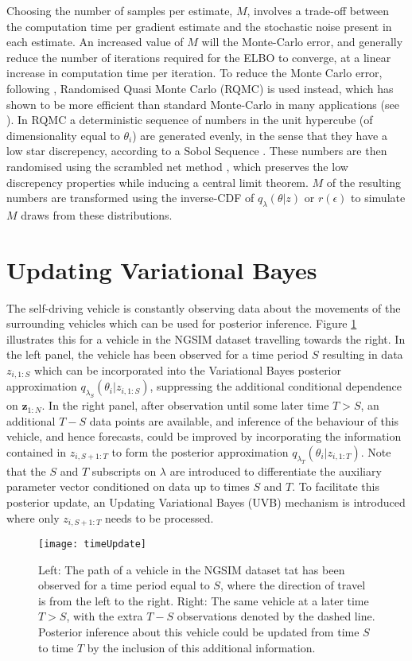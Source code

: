 \documentclass[12pt,a4paper]{article}\usepackage[]{graphicx}\usepackage[]{color}
\begin{document}
Choosing the number of samples per estimate, $M$, involves a trade-off between the computation time per gradient estimate and the stochastic noise present in each estimate. An increased value of $M$ will the Monte-Carlo error, and generally reduce the number of iterations required for the ELBO to converge, at a linear increase in computation time per iteration. To reduce the Monte Carlo error, following \citet{Gunawan2017}, Randomised Quasi Monte Carlo (RQMC) is used instead, which has shown to be more efficient than standard Monte-Carlo in many applications (see \cite{Niederreiter1992, Caflisch1998}). In RQMC a deterministic sequence of numbers in the unit hypercube (of dimensionality equal to $\theta_i$) are generated evenly, in the sense that they have a low star discrepency, according to a Sobol Sequence \citep{Sobol1967}. These numbers are then randomised using the scrambled net method \citep{Matousek1998}, which preserves the low discrepency properties while inducing a central limit theorem. $M$ of the resulting numbers are transformed using the inverse-CDF of $q_{\lambda}(\theta | z)$ or $r(\epsilon)$ to simulate $M$ draws from these distributions. 

\section{Updating Variational Bayes}
\label{sec:UVB}

The self-driving vehicle is constantly observing data about the movements of the surrounding vehicles which can be used for posterior inference. Figure \ref{fig:timeUpdate} illustrates this for a vehicle in the NGSIM dataset travelling towards the right. In the left panel, the vehicle has been observed for a time period $S$ resulting in data $z_{i, 1:S}$ which can be incorporated into the Variational Bayes posterior approximation $q_{\lambda_S}(\theta_{i} | z_{i, 1:S})$, suppressing the additional conditional dependence on $\textbf{z}_{1:N}$. In the right panel, after observation until some later time $T > S$, an additional $T - S$ data points are available, and inference of the behaviour of this vehicle, and hence forecasts, could be improved by incorporating the information contained in $z_{i, S+1:T}$ to form the posterior approximation $q_{\lambda_T}(\theta_{i} | z_{i, 1:T})$. Note that the $S$ and $T$ subscripts on $\lambda$ are introduced to differentiate the auxiliary parameter vector conditioned on data up to times $S$ and $T$. To facilitate this posterior update, an Updating Variational Bayes (UVB) mechanism is introduced where only $z_{i, S+1:T}$ needs to be processed.
\begin{figure}[ht]
\centering
\texttt{[image: timeUpdate]}
\caption{Left: The path of a vehicle in the NGSIM dataset tat has been observed for a time period equal to $S$, where the direction of travel is from the left to the right. Right: The same vehicle at a later time $T > S$, with the extra $T - S$ observations denoted by the dashed line. Posterior inference about this vehicle could be updated from time $S$ to time $T$ by the inclusion of this additional information.}
\label{fig:timeUpdate}
\end{figure}
\\
\end{document}
